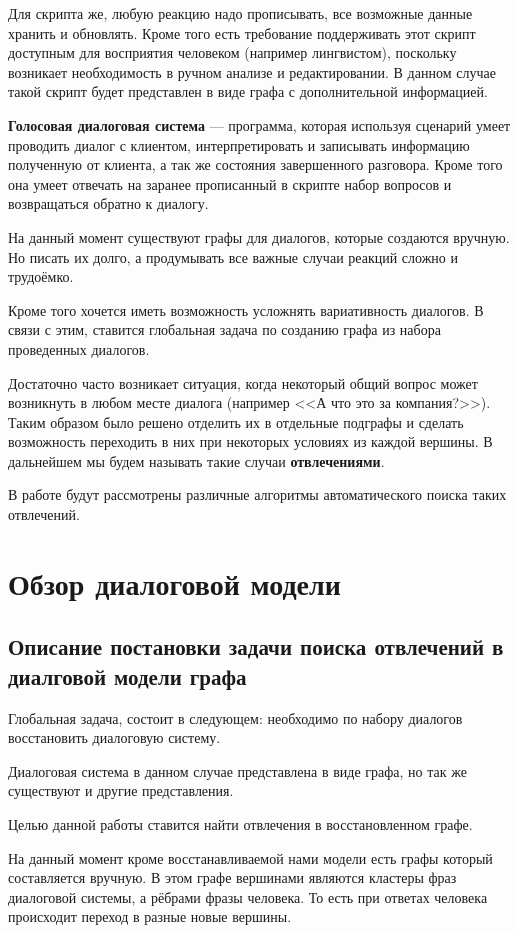 \documentclass[specification,annotation]{itmo-student-thesis}
\begin{document}
	Для скрипта же, любую реакцию надо прописывать, все возможные данные хранить и обновлять. Кроме того есть требование поддерживать этот скрипт доступным для восприятия человеком (например лингвистом), поскольку возникает необходимость в ручном анализе и редактировании. В данном случае такой скрипт будет представлен в виде графа с дополнительной информацией.
	
	\textbf{Голосовая диалоговая система} — программа, которая используя сценарий умеет проводить диалог с клиентом, интерпретировать и записывать  информацию полученную от клиента, а так же состояния завершенного разговора. Кроме того она умеет отвечать на заранее прописанный в скрипте набор вопросов и возвращаться обратно к диалогу.
	
	На данный момент существуют графы для диалогов, которые создаются вручную. Но писать их долго, а продумывать все важные случаи реакций сложно и трудоёмко. 
	
	Кроме того хочется иметь возможность усложнять вариативность диалогов. В связи с этим, ставится глобальная задача по созданию графа из набора проведенных диалогов. 
	
	Достаточно часто возникает ситуация, когда некоторый общий вопрос может возникнуть в любом месте диалога (например <<А что это за компания?>>). Таким образом было решено отделить их в отдельные подграфы и сделать возможность переходить в них при некоторых условиях из каждой вершины. В дальнейшем мы будем называть такие случаи \textbf{отвлечениями}.
	
	В работе будут рассмотрены различные алгоритмы автоматического поиска таких отвлечений.
	
	\chapter{Обзор диалоговой модели}
	\section{Описание постановки задачи поиска отвлечений в диалговой модели графа}
	Глобальная задача, состоит в следующем: необходимо по набору диалогов восстановить диалоговую систему.
	
	Диалоговая система в данном случае представлена в виде графа, но так же существуют и другие представления.
	
	Целью данной работы ставится найти отвлечения в восстановленном графе.
	
	На данный момент кроме восстанавливаемой нами модели есть графы который составляется вручную. В этом графе вершинами являются кластеры фраз диалоговой системы, а рёбрами фразы человека. То есть при ответах человека происходит переход в разные новые вершины.
	
\end{document}

